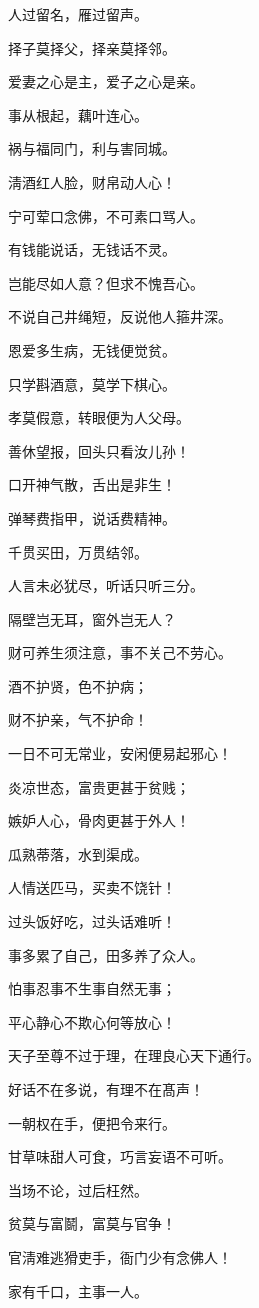 \documentclass[12pt,oneside]{book}
\begin{document}
人过留名，雁过留声。

择子莫择父，择亲莫择邻。

爱妻之心是主，爱子之心是亲。

事从根起，藕叶连心。

祸与福同门，利与害同城。

淸酒红人脸，财帛动人心！

宁可荤口念佛，不可素口骂人。

有钱能说话，无钱话不灵。

岂能尽如人意？但求不愧吾心。

不说自己井绳短，反说他人箍井深。

恩爱多生病，无钱便觉贫。

只学斟酒意，莫学下棋心。

孝莫假意，转眼便为人父母。

善休望报，回头只看汝儿孙！

口开神气散，舌出是非生！

弹琴费指甲，说话费精神。

千贯买田，万贯结邻。

人言未必犹尽，听话只听三分。

隔壁岂无耳，窗外岂无人？

财可养生须注意，事不关己不劳心。

酒不护贤，色不护病；

财不护亲，气不护命！

一日不可无常业，安闲便易起邪心！

炎凉世态，富贵更甚于贫贱；

嫉妒人心，骨肉更甚于外人！

瓜熟蒂落，水到渠成。

人情送匹马，买卖不饶针！

过头饭好吃，过头话难听！

事多累了自己，田多养了众人。

怕事忍事不生事自然无事；

平心静心不欺心何等放心！

天子至尊不过于理，在理良心天下通行。

好话不在多说，有理不在髙声！

一朝权在手，便把令来行。

甘草味甜人可食，巧言妄语不可听。

当场不论，过后枉然。

贫莫与富鬬，富莫与官争！

官淸难逃猾吏手，衙门少有念佛人！

家有千口，主事一人。
\end{document}
